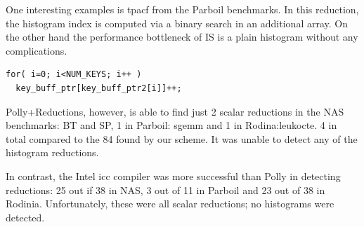 One interesting examples is tpacf from the Parboil benchmarks.
In this reduction, the histogram index is computed via a binary search in an additional array.
On the other hand the performance bottleneck of IS is a plain histogram without any complications.
\begin{lstlisting}
for( i=0; i<NUM_KEYS; i++ )
  key_buff_ptr[key_buff_ptr2[i]]++;
\end{lstlisting}

Polly+Reductions, however, is able to find just 2 scalar reductions in
the NAS benchmarks: BT and SP, 1 in Parboil: sgemm and 1 in
Rodina:leukocte. 4 in total compared to the 84 found by our scheme. It
was unable to detect any of the histogram reductions.

In contrast, the Intel icc compiler was more successful than Polly in detecting 
reductions: 25  out if 38 in NAS, 3 out of 11 in Parboil and 23 out of 38 in Rodinia.
Unfortunately, these were all scalar reductions; no histograms were detected.


\NASDetectionData

